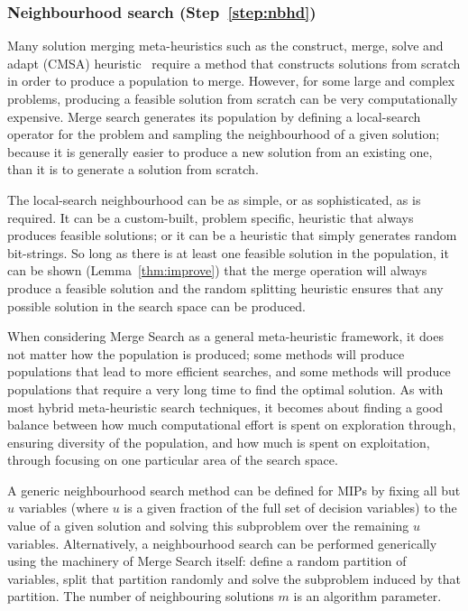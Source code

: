 \documentclass[journal]{IEEEtran}
\begin{document}
\subsubsection*{Neighbourhood search (Step~\ref{step:nbhd})}

Many solution merging meta-heuristics such as the construct, merge, solve and adapt (CMSA) heuristic~\cite{Blum2016} require a method that constructs solutions from scratch in order to produce a population to merge. However, for some large and complex problems, producing a feasible solution from scratch can be very computationally expensive. Merge search generates its population by defining a local-search operator for the problem and sampling the neighbourhood of a given solution; because it is generally easier to produce a new solution from an existing one, than it is to generate a solution from scratch. 

The local-search neighbourhood can be as simple, or as sophisticated, as is required. It can be a custom-built, problem specific, heuristic that always produces feasible solutions; or it can be a heuristic that simply generates random bit-strings. So long as there is at least one feasible solution in the population, it can be shown (Lemma~\ref{thm:improve}) that the merge operation will always produce a feasible solution and the random splitting heuristic ensures that any possible solution in the search space can be produced.

When considering Merge Search as a general meta-heuristic framework, it does not matter how the population is produced; some methods will produce populations that lead to more efficient searches, and some methods will produce populations that require a very long time to find the optimal solution. As with most hybrid meta-heuristic search techniques, it becomes about finding a good balance between how much computational effort is spent on exploration through, ensuring diversity of the population, and how much is spent on exploitation, through focusing on one particular area of the search space.

A generic neighbourhood search method can be defined for MIPs by fixing all but \(u\) variables (where \(u\) is a given fraction of the full set of decision variables) to the value of a given solution and solving this subproblem over the remaining \(u\) variables. Alternatively, a neighbourhood search can be performed generically using the machinery of Merge Search itself: define a random partition of variables, split that partition randomly and solve the subproblem induced by that partition. The number of neighbouring solutions $m$ is an algorithm parameter.
\end{document}
